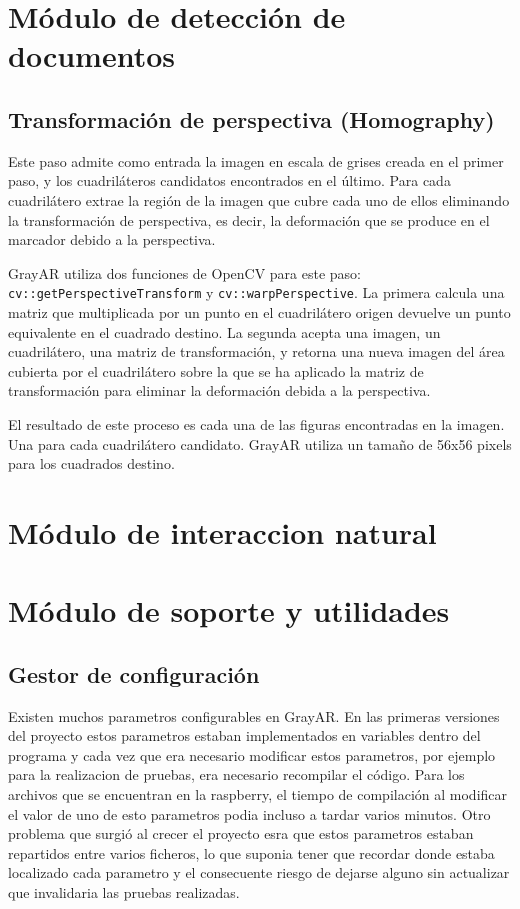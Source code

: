

\section{Módulo de detección de documentos}
\subsection{Transformación de perspectiva (Homography)}
Este paso admite como entrada la imagen en escala de grises creada en el primer paso, y los cuadriláteros candidatos encontrados en el último. Para cada cuadrilátero extrae la región de la imagen que cubre cada uno de ellos eliminando la transformación de perspectiva, es decir, la deformación que se produce en el marcador debido a la perspectiva.

GrayAR utiliza dos funciones de OpenCV para este paso: \texttt{cv::getPerspectiveTransform} y \texttt{cv::warpPerspective}. La primera calcula una matriz que multiplicada por un punto en el cuadrilátero origen devuelve un punto equivalente en el cuadrado destino. La segunda acepta una imagen, un cuadrilátero, una matriz de transformación, y retorna una nueva imagen del área cubierta por el cuadrilátero sobre la que se ha aplicado la matriz de transformación para eliminar la deformación debida a la perspectiva. 

El resultado de este proceso es cada una de las figuras encontradas en la imagen. Una para cada cuadrilátero candidato. GrayAR utiliza un tamaño de 56x56 pixels para los cuadrados destino.


\section{Módulo de interaccion natural}
\section{Módulo de soporte y utilidades}
\subsection{Gestor de configuración}
Existen muchos parametros configurables en GrayAR. En las primeras versiones del proyecto estos parametros estaban implementados en variables dentro del programa y cada vez que era necesario modificar estos parametros, por ejemplo para la realizacion de pruebas, era necesario recompilar el código. Para los archivos que se encuentran en la raspberry, el tiempo de compilación al modificar el valor de uno de esto parametros podia incluso a tardar varios minutos. Otro problema que surgió al crecer el proyecto esra que estos parametros estaban repartidos entre varios ficheros, lo que suponia tener que recordar donde estaba localizado cada parametro y el consecuente riesgo de dejarse alguno sin actualizar que invalidaria las pruebas realizadas.

